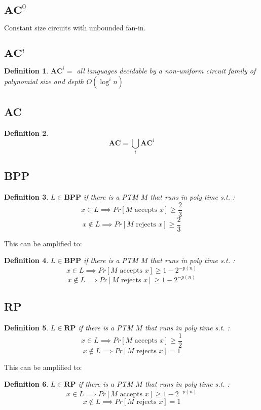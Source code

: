 \documentclass[]{article}
\theoremstyle{break}
\theoremstyle{break}
\newtheorem{definition}{Definition}[section]
\begin{document}
\subsection{$\textbf{AC}^0$}
\label{sec:AC0}
Constant size circuits with unbounded fan-in.
\subsection{$\textbf{AC}^i$}
\label{sec:ACi}
\begin{definition}
	$\textbf{AC}^i = $ all languages decidable by a non-uniform circuit family of polynomial size and depth $O(\log^i n)$
\end{definition}
\subsection{AC}
\label{sec:AC}
\begin{definition}
	$$\textbf{AC} = \bigcup_i \hyperref[sec:ACi]{\textbf{AC}^i}$$
\end{definition}

\subsection{BPP}
\label{sec:bpp}
\begin{definition}
	$L\in \textbf{BPP}$ if there is a PTM $M$ that runs in poly time s.t. :
	$$x \in L \implies 	Pr[M \text{ accepts } x]\geq \frac{2}{3}$$
	$$x \notin L \implies 	Pr[M \text{ rejects } x]\geq \frac{2}{3}$$
\end{definition}
This can be amplified to:
\begin{definition}
	$L\in \textbf{BPP}$ if there is a PTM $M$ that runs in poly time s.t. :
	$$x \in L \implies 	Pr[M \text{ accepts } x]\geq 1 - 2^{-p(n)}$$
	$$x \notin L \implies 	Pr[M \text{ rejects } x]\geq 1 - 2^{-p(n)}$$
\end{definition}
\subsection{RP}
\label{sec:rp}
\begin{definition}
	$L\in \textbf{RP}$ if there is a PTM $M$ that runs in poly time s.t. :
	$$x \in L \implies 	Pr[M \text{ accepts } x]\geq \frac{1}{2}$$
	$$x \notin L \implies 	Pr[M \text{ rejects } x] = 1$$
\end{definition}
This can be amplified to:
\begin{definition}
	$L\in \textbf{RP}$ if there is a PTM $M$ that runs in poly time s.t. :
	$$x \in L \implies 	Pr[M \text{ accepts } x]\geq 1 - 2^{-p(n)}$$
	$$x \notin L \implies 	Pr[M \text{ rejects } x] = 1$$
\end{definition}
\end{document}
